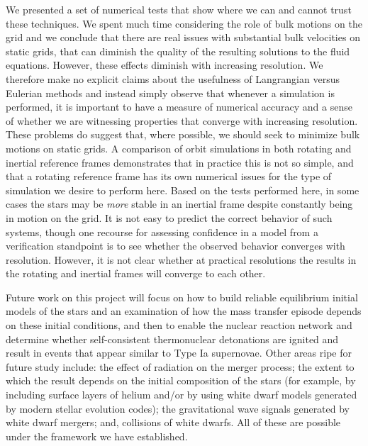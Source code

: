 \documentclass[iop]{../emulateapj}
\begin{document}
We presented a set of numerical tests that show where we can 
and cannot trust these techniques. We spent much time considering 
the role of bulk motions on the grid and we conclude that there 
are real issues with substantial bulk velocities on static grids, 
that can diminish the quality of the resulting solutions to the 
fluid equations. However, these effects diminish with increasing 
resolution. We therefore make no explicit claims about the usefulness 
of Langrangian versus Eulerian methods and instead simply observe 
that whenever a simulation is performed, it is important to have 
a measure of numerical accuracy and a sense of whether we are 
witnessing properties that converge with increasing resolution.
These problems do suggest that, where possible, we should seek to 
minimize bulk motions on static grids. A comparison of orbit 
simulations in both rotating and inertial reference frames 
demonstrates that in practice this is not so simple, and that 
a rotating reference frame has its own numerical issues for 
the type of simulation we desire to perform here. Based on 
the tests performed here, in some cases the stars may be 
\textit{more} stable in an inertial frame despite 
constantly being in motion on the grid. It 
is not easy to predict the correct behavior of such systems, 
though one recourse for assessing confidence in a model from a 
verification standpoint is to see whether the observed 
behavior converges with resolution. However, it is not clear 
whether at practical resolutions the results in the 
rotating and inertial frames will converge to each other.

Future work on this project will focus on how to build 
reliable equilibrium initial models of the stars and 
an examination of how the mass transfer episode depends on 
these initial conditions, and then to enable the nuclear 
reaction network and determine whether self-consistent 
thermonuclear detonations are ignited and result in 
events that appear similar to Type Ia supernovae. Other 
areas ripe for future study include: the effect of radiation 
on the merger process; the extent to which the result 
depends on the initial composition of the stars (for example, 
by including surface layers of helium and/or by using 
white dwarf models generated by modern stellar evolution 
codes); the gravitational wave signals generated by 
white dwarf mergers; and, collisions of white dwarfs. All of 
these are possible under the framework we have established.

\acknowledgments
\end{document}
